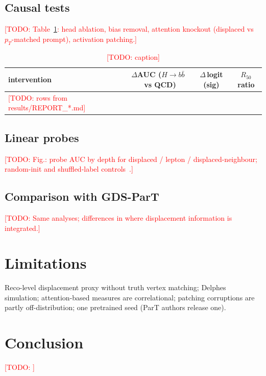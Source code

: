 \documentclass[10pt]{article}
\newcommand{\todo}[1]{\textcolor{red}{[TODO: #1]}}
\newcommand{\Hbb}{\ensuremath{H\to b\bar b}}
\begin{document}
\subsection{Causal tests}
\todo{Table~\ref{tab:causal}: head ablation, bias removal, attention knockout (displaced vs $p_T$-matched prompt), activation patching.}
\begin{table}[t]\centering\small
\begin{tabular}{lccc}\toprule
intervention & $\Delta$AUC (\Hbb\ vs QCD) & $\Delta\,$logit (sig) & $R_{50}$ ratio \\\midrule
\todo{rows from results/REPORT\_*.md} & & & \\\bottomrule
\end{tabular}
\caption{\todo{caption}}\label{tab:causal}\end{table}

\subsection{Linear probes}
\todo{Fig.: probe AUC by depth for displaced / lepton / displaced-neighbour; random-init and shuffled-label controls~\cite{belinkov2022}.}

\subsection{Comparison with GDS-ParT}
\todo{Same analyses; differences in where displacement information is integrated.}

\section{Limitations}
Reco-level displacement proxy without truth vertex matching; Delphes simulation; attention-based measures are
correlational; patching corruptions are partly off-distribution; one pretrained seed (ParT authors release one).

\section{Conclusion}
\todo{}



\end{document}
